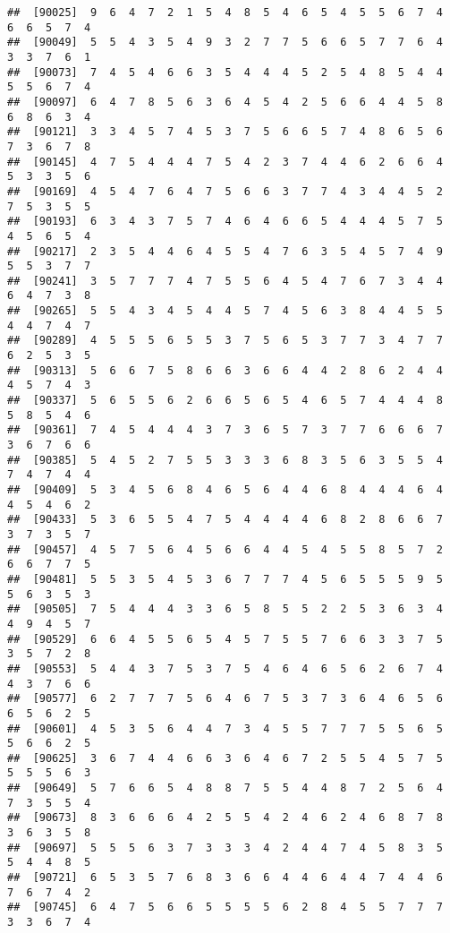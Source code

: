 \documentclass[
]{book}
\begin{document}
\begin{verbatim}
##  [90025]  9  6  4  7  2  1  5  4  8  5  4  6  5  4  5  5  6  7  4  6  6  5  7  4
##  [90049]  5  5  4  3  5  4  9  3  2  7  7  5  6  6  5  7  7  6  4  3  3  7  6  1
##  [90073]  7  4  5  4  6  6  3  5  4  4  4  5  2  5  4  8  5  4  4  5  5  6  7  4
##  [90097]  6  4  7  8  5  6  3  6  4  5  4  2  5  6  6  4  4  5  8  6  8  6  3  4
##  [90121]  3  3  4  5  7  4  5  3  7  5  6  6  5  7  4  8  6  5  6  7  3  6  7  8
##  [90145]  4  7  5  4  4  4  7  5  4  2  3  7  4  4  6  2  6  6  4  5  3  3  5  6
##  [90169]  4  5  4  7  6  4  7  5  6  6  3  7  7  4  3  4  4  5  2  7  5  3  5  5
##  [90193]  6  3  4  3  7  5  7  4  6  4  6  6  5  4  4  4  5  7  5  4  5  6  5  4
##  [90217]  2  3  5  4  4  6  4  5  5  4  7  6  3  5  4  5  7  4  9  5  5  3  7  7
##  [90241]  3  5  7  7  7  4  7  5  5  6  4  5  4  7  6  7  3  4  4  6  4  7  3  8
##  [90265]  5  5  4  3  4  5  4  4  5  7  4  5  6  3  8  4  4  5  5  4  4  7  4  7
##  [90289]  4  5  5  5  6  5  5  3  7  5  6  5  3  7  7  3  4  7  7  6  2  5  3  5
##  [90313]  5  6  6  7  5  8  6  6  3  6  6  4  4  2  8  6  2  4  4  4  5  7  4  3
##  [90337]  5  6  5  5  6  2  6  6  5  6  5  4  6  5  7  4  4  4  8  5  8  5  4  6
##  [90361]  7  4  5  4  4  4  3  7  3  6  5  7  3  7  7  6  6  6  7  3  6  7  6  6
##  [90385]  5  4  5  2  7  5  5  3  3  3  6  8  3  5  6  3  5  5  4  7  4  7  4  4
##  [90409]  5  3  4  5  6  8  4  6  5  6  4  4  6  8  4  4  4  6  4  4  5  4  6  2
##  [90433]  5  3  6  5  5  4  7  5  4  4  4  4  6  8  2  8  6  6  7  3  7  3  5  7
##  [90457]  4  5  7  5  6  4  5  6  6  4  4  5  4  5  5  8  5  7  2  6  6  7  7  5
##  [90481]  5  5  3  5  4  5  3  6  7  7  7  4  5  6  5  5  5  9  5  5  6  3  5  3
##  [90505]  7  5  4  4  4  3  3  6  5  8  5  5  2  2  5  3  6  3  4  4  9  4  5  7
##  [90529]  6  6  4  5  5  6  5  4  5  7  5  5  7  6  6  3  3  7  5  3  5  7  2  8
##  [90553]  5  4  4  3  7  5  3  7  5  4  6  4  6  5  6  2  6  7  4  4  3  7  6  6
##  [90577]  6  2  7  7  7  5  6  4  6  7  5  3  7  3  6  4  6  5  6  6  5  6  2  5
##  [90601]  4  5  3  5  6  4  4  7  3  4  5  5  7  7  7  5  5  6  5  5  6  6  2  5
##  [90625]  3  6  7  4  4  6  6  3  6  4  6  7  2  5  5  4  5  7  5  5  5  5  6  3
##  [90649]  5  7  6  6  5  4  8  8  7  5  5  4  4  8  7  2  5  6  4  7  3  5  5  4
##  [90673]  8  3  6  6  6  4  2  5  5  4  2  4  6  2  4  6  8  7  8  3  6  3  5  8
##  [90697]  5  5  5  6  3  7  3  3  3  4  2  4  4  7  4  5  8  3  5  5  4  4  8  5
##  [90721]  6  5  3  5  7  6  8  3  6  6  4  4  6  4  4  7  4  4  6  7  6  7  4  2
##  [90745]  6  4  7  5  6  6  5  5  5  5  6  2  8  4  5  5  7  7  7  3  3  6  7  4

\end{verbatim}
\end{document}
